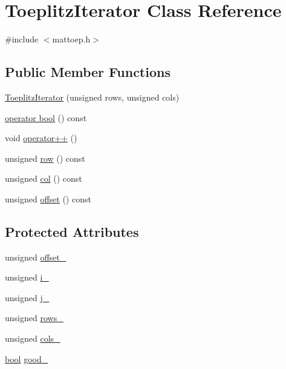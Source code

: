 \hypertarget{classToeplitzIterator}{}\section{Toeplitz\+Iterator Class Reference}
\label{classToeplitzIterator}


{\ttfamily \#include $<$mattoep.\+h$>$}

\subsection*{Public Member Functions}
\begin{DoxyCompactItemize}
\item 
\hyperlink{classToeplitzIterator_ae8e8cf5aebb1d18154f9a0f51ea76004}{Toeplitz\+Iterator} (unsigned rows, unsigned cols)
\item 
\hyperlink{classToeplitzIterator_a36f3ded21500ef7a0df2a480f667aea7}{operator bool} () const 
\item 
void \hyperlink{classToeplitzIterator_a6f2b3f41c1633769277997bce0f90fb9}{operator++} ()
\item 
unsigned \hyperlink{classToeplitzIterator_a737a799a6b3190e2b052af2e50a4f6d5}{row} () const 
\item 
unsigned \hyperlink{classToeplitzIterator_ac0af06a9ab9bd4e208f1d6c62875061f}{col} () const 
\item 
unsigned \hyperlink{classToeplitzIterator_a34529860401fa5183e64189223b78279}{offset} () const 
\end{DoxyCompactItemize}
\subsection*{Protected Attributes}
\begin{DoxyCompactItemize}
\item 
unsigned \hyperlink{classToeplitzIterator_ad334e0b9de29ed027b35f5d096bb8e98}{offset\+\_\+}
\item 
unsigned \hyperlink{classToeplitzIterator_a3c3e35c4e0163b9dbd6c3d8b0e318c77}{i\+\_\+}
\item 
unsigned \hyperlink{classToeplitzIterator_a88bdb00dbd25f207efca52fbb373c637}{j\+\_\+}
\item 
unsigned \hyperlink{classToeplitzIterator_acc1568fc4b29f056d4e59176e351c790}{rows\+\_\+}
\item 
unsigned \hyperlink{classToeplitzIterator_a0ee7bbef9e883cd666b1e3e4c2f82097}{cols\+\_\+}
\item 
\hyperlink{compiler_8h_abb452686968e48b67397da5f97445f5b}{bool} \hyperlink{classToeplitzIterator_afe73d7874f9af9ba2b78399a51c6d5ad}{good\+\_\+}
\end{DoxyCompactItemize}


